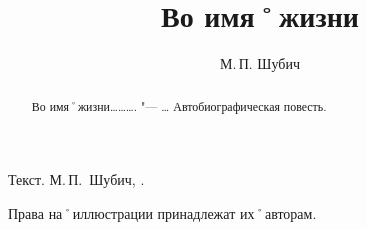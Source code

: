 ﻿%
\title{\huge\bf Во имя˚жизни}										%
\author{\LARGE М.\,П. Шубич}											%

\maketitle																			%


\abstractstyle{\footnotesize}
{\item Текст. М.\,П.~Шубич, \theyear.\\ 
\item Права на˚иллюстрации принадлежат их˚авторам.}

\begin{abstract}
 {Во имя˚жизни………. "--- …}
Автобиографическая повесть.
\end{abstract}


\setcounter{page}{3}										%